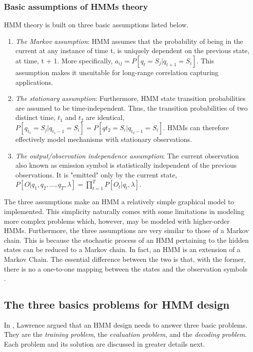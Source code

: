 \subsubsection{Basic assumptions of HMMs theory}
HMM theory is built on three basic assumptions listed below.
\begin{enumerate}
\label{con:markov} \item \textit{The Markov assumption}: HMM assumes that the probability of being in the current	at any instance of time t, is uniquely dependent on the previous state, at time, t + 1. More specifically, \(a_{ij} = P[q_t = S_j|q_{t+1}=S_i]\). This assumption makes it unsuitable for long-range correlation capturing applications.

\item \textit{The stationary assumption}: Furthermore, HMM state transition probabilities are assumed to be time-independent. Thus, the transition probabilities of two distinct time, \(t_1\) and \(t_2\) are identical, \(P[q_{t_1} = S_j|q_{t_1 -1} = S_i] = P[q{t_2}=S_i|q_{t_2-1} = S_i]\). HMMs can therefore effectively model mechanisms with stationary observations.

\item \textit{The output/observation independence assumption}: The current observation also known as emission symbol is statistically independent of the previous observations. It is "emitted" only by the current state, \(P[O|q_1, q_2, ..., q_T, \lambda]=\prod_{t=1}^{T}P[O_t|q_t, \lambda]\).
\end{enumerate} 
The three assumptions make an HMM a relatively simple graphical model to implemented. This simplicity naturally comes with some limitations in modeling more complex problems which, however, may be modeled with higher-order HMMs. %
Furthermore, the three assumptions are very similar to those of a Markov chain. This is because the stochastic process of an HMM pertaining to the hidden states can be reduced to a Markov chain. In fact, an HMM is an extension of a Markov Chain. The essential difference between the two is that, with the former, there is no a one-to-one mapping between the states and the observation symbols \cite{biol1998}.

\subsection{The three basics problems for HMM design}
In \cite{tuto1989}, Lawrence argued that an HMM design needs to answer three basic problems. They are the \textit{training problem}, the \textit{evaluation problem}, and the \textit{decoding problem}. Each problem and its solution are discussed in greater details next. 

